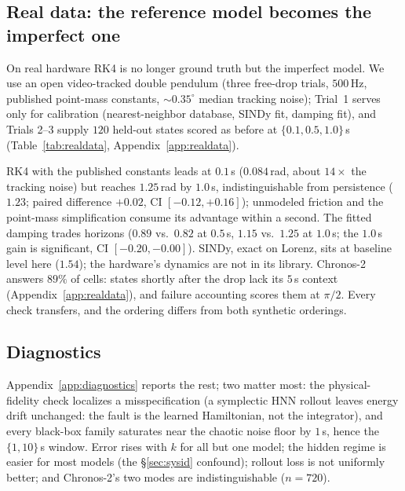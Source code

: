 \documentclass{article}
\begin{document}
\subsection{Real data: the reference model becomes the imperfect one}
\label{sec:realdata}
On real hardware RK4 is no longer ground truth but the imperfect model. We use an open
video-tracked double pendulum \citep{myers2020pendulum} (three free-drop trials,
$500$\,Hz, published point-mass constants, ${\sim}0.35^{\circ}$ median tracking noise);
Trial~1 serves only for calibration (nearest-neighbor database, SINDy fit, damping fit),
and Trials 2--3 supply $120$ held-out states scored as before at $\{0.1,0.5,1.0\}$\,s
(Table~\ref{tab:realdata}, Appendix~\ref{app:realdata}).

RK4 with the published constants leads at $0.1$\,s ($0.084$\,rad, about $14\times$ the
tracking noise) but reaches $1.25$\,rad by $1.0$\,s, indistinguishable from persistence
($1.23$; paired difference $+0.02$, CI $[-0.12,+0.16]$); unmodeled friction and the
point-mass simplification consume its advantage within a second. The fitted damping trades
horizons ($0.89$ vs.\ $0.82$ at $0.5$\,s, $1.15$ vs.\ $1.25$ at $1.0$\,s; the $1.0$\,s gain
is significant, CI $[-0.20,-0.00]$). SINDy, exact on Lorenz, sits at baseline
level here ($1.54$); the hardware's dynamics are not in its library. Chronos-2 answers $89\%$
of cells: states shortly after the drop lack its $5$\,s context
(Appendix~\ref{app:realdata}), and failure accounting scores them at $\pi/2$. Every check
transfers, and the ordering differs from both synthetic orderings.

\subsection{Diagnostics}
\label{sec:behavior}
Appendix~\ref{app:diagnostics} reports the rest; two matter most: the
physical-fidelity check localizes a misspecification (a symplectic HNN rollout leaves energy drift
unchanged: the fault is the learned Hamiltonian, not the integrator), and
every black-box family saturates near the chaotic noise floor by $1$\,s, hence the
$\{1,10\}$\,s window. Error rises with $k$ for all but one model; the hidden regime is easier
for most models (the \S\ref{sec:sysid} confound); rollout loss is not uniformly better; and
Chronos-2's two modes are indistinguishable ($n{=}720$).
\end{document}
